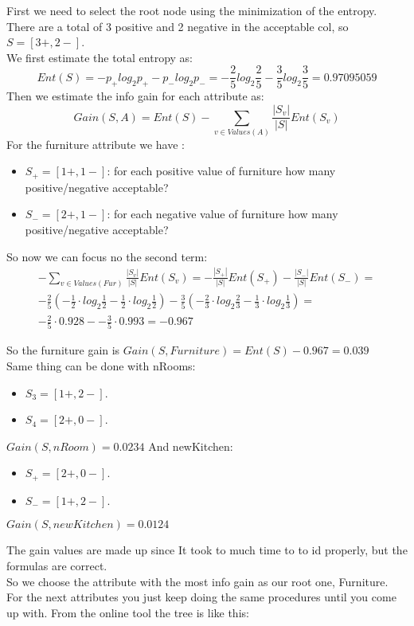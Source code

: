 First we need to select the root node using the minimization of the entropy.\\
There are a total of 3 positive and 2 negative in the acceptable col, so $S=[3+,2-]$.\\
We first estimate the total entropy as:
$$Ent(S)=-p_+log_2p_+ -p_- log_2p_-=-\frac{2}{5}log_2\frac{2}{5}-\frac{3}{5}log_2\frac{3}{5}=0.97095059$$
Then we estimate the info gain for each attribute as:
$$Gain(S,A)=Ent(S)-\sum_{v \in Values(A)}\frac{|S_v|}{|S|}Ent(S_v)$$
For the furniture attribute we have :
\begin{itemize}
\item $S_+=[1+,1-]$: for each positive value of furniture how many positive/negative acceptable?
\item $S_-=[2+,1-]$: for each negative value of furniture how many positive/negative acceptable?
\end{itemize}
So now we can focus no the second term:
\begin{equation}
\begin{aligned}
-\sum_{v \in Values(Fur)}\frac{|S_v|}{|S|}Ent(S_v)=-\frac{|S_+|}{|S|}Ent(S_+)-\frac{|S_-|}{|S|}Ent(S_-)= \\
-\frac{2}{5}(-\frac{1}{2}\cdot log_2\frac{1}{2}-\frac{1}{2}\cdot log_2\frac{1}{2})-\frac{3}{5}(-\frac{2}{3}\cdot log_2\frac{2}{3}-\frac{1}{3}\cdot log_2\frac{1}{3})=\\
-\frac{2}{5}\cdot 0.928 - -\frac{3}{5}\cdot 0.993=-0.967
\end{aligned}
\end{equation}

So the furniture gain is $Gain(S,Furniture)=Ent(S)-0.967=0.039$\\

Same thing can be done with nRooms:
\begin{itemize}
\item $S_3=[1+,2-]$.
\item $S_4=[2+,0-]$. 
\end{itemize}
$Gain(S,nRoom)=0.0234$
And newKitchen:
\begin{itemize}
\item $S_+=[2+,0-]$.
\item $S_-=[1+,2-]$. 
\end{itemize}
$Gain(S,newKitchen)=0.0124$

The gain values are made up since It took to much time to to id properly, but the formulas are correct.\\

So we choose the attribute with the most info gain as our root one, Furniture. For the next attributes you just keep doing the same procedures until you come up with. From the online tool the tree is like this:

